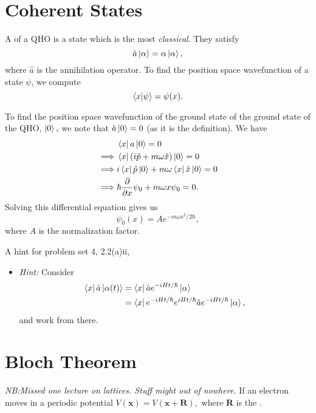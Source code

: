 \documentclass{article}
\numberwithin{equation}{section}
\begin{document}
\section{Coherent States}
A  of a QHO is a state which is the most \textit{classical}. They satisfy 
\begin{equation}
    \hat{a}\ket{\alpha} = \alpha\ket{\alpha},
\end{equation}
where $\hat{a}$ is the annihilation operator. To find the position space wavefunction of a state $\psi$, we compute
\begin{equation}
    \bra{x}\ket{\psi}=\psi(x).
\end{equation}
\begin{example}
    To find the position space wavefunction of the ground state of the ground state of the QHO, $\ket{0},$ we note that $\hat{a}\ket{0} = 0$ (as it is the definition). We have 
    \begin{align}
        & \bra{x}a\ket{0}=0\\ 
        \implies & \bra{x}(i\hat{p}+m\omega \hat{x})\ket{0} = 0 \\ 
        \implies & i\bra{x}\hat{p}\ket{0} + m\omega\bra{x}\hat{x}\ket{0} = 0 \\
        \implies & \hbar \frac{\partial}{\partial x}\psi_0 + m\omega x\psi_0 = 0.
    \end{align}
    Solving this differential equation gives us 
    \begin{equation}
        \psi_0(x) = Ae^{-m\omega x^2/2\hbar},
    \end{equation}
    where $A$ is the normalization factor.
\end{example}
A hint for problem set 4, 2.2(a)ii,
\begin{itemize}
    \item \textit{Hint:} Consider
    \begin{align}
        \bra{x}\hat{a}\ket{\alpha(t)}&=\bra{x}\hat{a}e^{-iHt/\hbar}\ket{\alpha} \\ 
        &= \bra{x}e^{-iHt/\hbar}e^{iHt/\hbar}\hat{a}e^{-iHt/\hbar}\ket{\alpha},
    \end{align}
    and work from there.
\end{itemize}
\section{Bloch Theorem}
\textit{NB:Missed one lecture on lattices. Stuff might out of nowhere.}
If an electron moves in a periodic potential $V(\bm{x})=V(\bm{x}+\bm{R}),$ where $\bm{R}$ is the .
\end{document}
